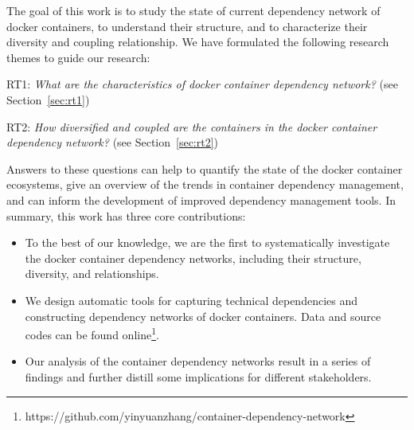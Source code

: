 \documentclass[sigconf]{acmart}
\begin{document}
The goal of this work is to study the state of current
dependency network of docker containers, to understand their structure, and to characterize their diversity and coupling relationship. We have formulated the
following research themes to guide our research:

\textsf{RT1}: \emph{What are the characteristics of docker container dependency network?} (see Section~\ref{sec:rt1})

\textsf{RT2}: \emph{How diversified and coupled are the containers in the docker container dependency network?} (see Section~\ref{sec:rt2})

Answers to these questions can help to quantify the state of
the docker container ecosystems, give an overview of the trends in container dependency management, and can inform the development of improved dependency management tools. 
In summary, this work has three core contributions:%



\begin{itemize}

\item To the best of our knowledge, we are the first to systematically investigate the docker container dependency networks, including their structure, diversity, and relationships.
\item We design automatic tools for capturing technical dependencies and constructing dependency networks of docker containers. Data and source codes can be found online\footnote{https://github.com/yinyuanzhang/container-dependency-network}.
\item Our analysis of the container dependency networks result in a series of findings and further distill some implications for different stakeholders.%
\end{itemize}
\end{document}

